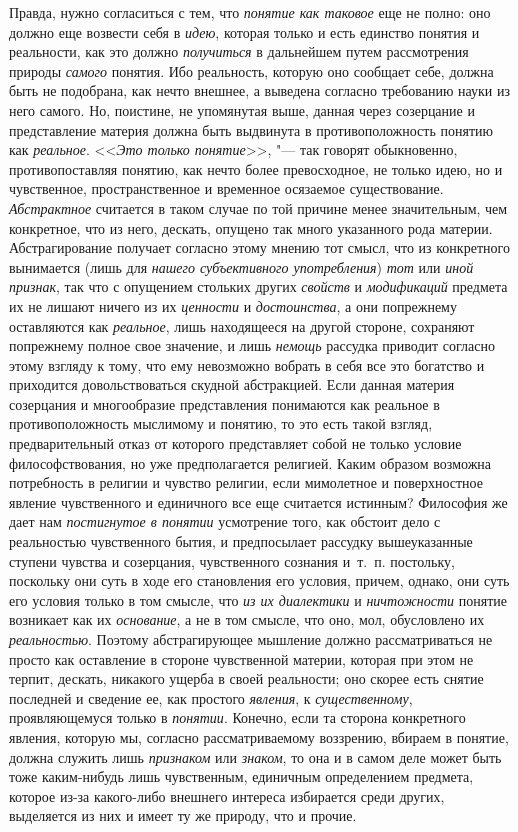 Правда, нужно согласиться с тем, что {\em понятие как таковое}
еще не полно: оно должно еще возвести себя в {\em идею}, которая
только и есть единство понятия и реальности, как это должно
{\em получиться} в дальнейшем путем рассмотрения природы
{\em самого} понятия. Ибо
реальность, которую оно сообщает себе, должна быть не подобрана, как нечто
внешнее, а выведена согласно требованию науки из него самого. Но, поистине,
не упомянутая выше, данная через созерцание и представление материя должна
быть выдвинута в противоположность понятию как {\em реальное}.
<<{\em Это только понятие}>>, "---
так говорят обыкновенно, противопоставляя понятию, как нечто
более превосходное, не только идею, но и чувственное, пространственное и
временное осязаемое существование. {\em Абстрактное}
считается в таком случае по той причине менее значительным,
чем конкретное, что из него, дескать, опущено так много указанного рода
материи. Абстрагирование получает согласно этому мнению тот смысл, что из
конкретного вынимается (лишь для {\em нашего субъективного
употребления}) {\em тот} или {\em иной признак},
так что с опущением стольких других {\em свойств} и {\em модификаций}
предмета их не лишают ничего из их {\em ценности} и {\em достоинства}, а они
попрежнему оставляются как {\em реальное}, лишь находящееся на другой
стороне, сохраняют попрежнему полное свое значение, и лишь {\em немощь}
рассудка приводит согласно этому взгляду к тому, что ему
невозможно вобрать в себя все это богатство и приходится довольствоваться
скудной абстракцией. Если данная материя созерцания и многообразие
представления понимаются как реальное в противоположность мыслимому и
понятию, то это есть такой взгляд, предварительный отказ от которого
представляет собой не только условие философствования, но уже
предполагается религией. Каким образом возможна потребность в религии и
чувство религии, если мимолетное и поверхностное явление чувственного и
единичного все еще считается истинным? Философия же дает нам
{\em постигнутое в понятии}
усмотрение того, как обстоит дело с реальностью чувственного
бытия, и предпосылает рассудку вышеуказанные ступени чувства и созерцания,
чувственного сознания и~т.~п. постольку, поскольку они суть
в ходе его становления его условия, причем, однако, они суть его условия
только в том смысле, что {\em из их диалектики} и
{\em ничтожности} понятие возникает как их {\em основание},
а не в том смысле, что оно, мол, обусловлено их {\em реальностью}.
Поэтому абстрагирующее мышление должно рассматриваться не
просто как оставление в стороне чувственной материи, которая при этом не
терпит, дескать, никакого ущерба в своей реальности; оно скорее есть снятие
последней и сведение ее, как простого {\em явления}, к {\em существенному},
проявляющемуся только в {\em понятии}. Конечно,
если та сторона конкретного явления, которую мы, согласно рассматриваемому
воззрению, вбираем в понятие, должна служить лишь
{\em признаком} или {\em знаком}, то она и в
самом деле может быть тоже каким-нибудь лишь чувственным, единичным
определением предмета, которое из-за какого-либо внешнего интереса
избирается среди других, выделяется из них и имеет ту же природу, что и прочие.

